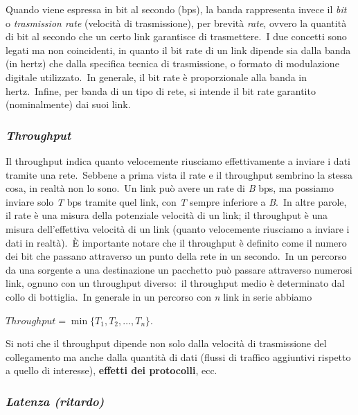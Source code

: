 Quando viene espressa in bit al secondo (bps), la banda rappresenta invece il \emph{bit} o \emph{trasmission rate} (velocità di trasmissione), per brevità \emph{rate}, ovvero la quantità di bit al secondo che un certo link garantisce di trasmettere.\
I due concetti sono legati ma non coincidenti, in quanto il bit rate di un link dipende sia dalla banda (in hertz) che dalla specifica tecnica di trasmissione, o formato di modulazione digitale utilizzato.\
In generale, il bit rate è proporzionale alla banda in hertz.\
Infine, per banda di un tipo di rete, si intende il bit rate garantito (nominalmente) dai suoi link.

\subsubsection{\emph{Throughput}}

Il throughput indica quanto velocemente riusciamo effettivamente a inviare i dati tramite una rete.\
Sebbene a prima vista il rate e il throughput sembrino la stessa cosa, in realtà non lo sono.\
Un link può avere un rate di \emph{B} bps, ma possiamo inviare solo \emph{T} bps tramite quel link, con \emph{T} sempre inferiore a \emph{B}.\
In altre parole, il rate è una misura della potenziale velocità di un link; il throughput è una misura dell'effettiva velocità di un link (quanto velocemente riusciamo a inviare i dati in realtà).\
È importante notare che il throughput è definito come il numero dei bit che passano attraverso un punto della rete in un secondo.\
In un percorso da una sorgente a una destinazione un pacchetto può passare attraverso numerosi link, ognuno con un throughput diverso:\ il throughput medio è determinato dal collo di bottiglia.\
In generale in un percorso con \emph{n} link in serie abbiamo
\begin{center}
    $Throughput = \min\{T_1, T_2, \dots, T_n\}$.
\end{center}
Si noti che il throughput dipende non solo dalla velocità di trasmissione del collegamento ma anche dalla quantità di dati (flussi di traffico aggiuntivi rispetto a quello di interesse), \textbf{effetti dei protocolli}, ecc.

\subsubsection{\emph{Latenza (ritardo)}}

